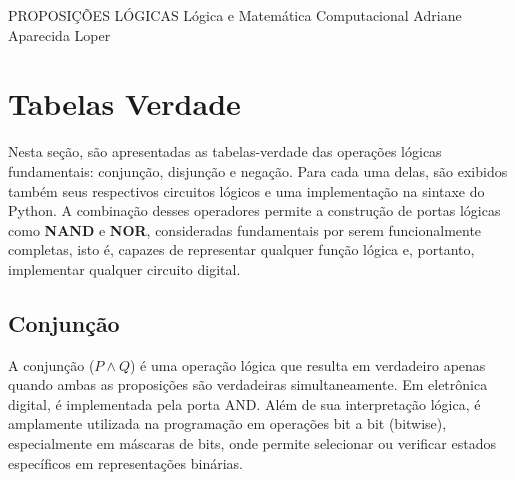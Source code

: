 \documentclass[12pt,a4paper]{article}
\begin{document}
\montarinicio
    {PROPOSIÇÕES LÓGICAS}
    {Lógica e Matemática Computacional}
    {Adriane Aparecida Loper}


\section{Tabelas Verdade}

Nesta seção, são apresentadas as tabelas-verdade das operações lógicas fundamentais: conjunção, disjunção e negação. Para cada uma delas, são exibidos também seus respectivos circuitos lógicos e uma implementação na sintaxe do Python. A combinação desses operadores permite a construção de portas lógicas como \textbf{NAND} e \textbf{NOR}, consideradas fundamentais por serem funcionalmente completas, isto é, capazes de representar qualquer função lógica e, portanto, implementar qualquer circuito digital.

\subsection{Conjunção}

A conjunção ($P \land Q$) é uma operação lógica que resulta em verdadeiro apenas quando ambas as proposições são verdadeiras simultaneamente. Em eletrônica digital, é implementada pela porta AND. Além de sua interpretação lógica, é amplamente utilizada na programação em operações bit a bit (bitwise), especialmente em máscaras de bits, onde permite selecionar ou verificar estados específicos em representações binárias.
\end{document}
